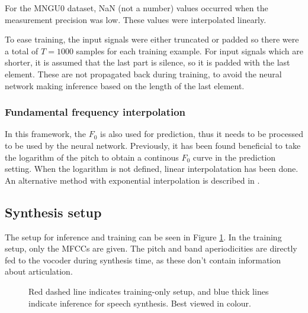 \documentclass[a4paper]{article}
\begin{document}
For the MNGU0 dataset, NaN (not a number) values occurred when the measurement precision
was low. These values were interpolated linearly. 

To ease training, the input signals were either truncated or padded
so there were a total of \( T = 1000 \) samples for each training example.
For input signals which are shorter, it is assumed that the last part is
silence, so it is padded with the last element. These are not propagated back during training, to avoid the neural network making inference based on the length of the last element.

\subsubsection{Fundamental frequency interpolation}

In this framework, the \( F_0 \) is also used for prediction, thus it
needs to be processed to be used by the neural network. 
Previously, it has been found beneficial to take the logarithm of the
pitch to obtain a continous \( F_0 \) curve in the prediction setting.
When the logarithm is not defined, linear  interpolatation has been done. \cite{Gonzalez2017}
An alternative method with exponential interpolation is described in \cite{Chen1997}.

\subsection{Synthesis setup}

The setup for inference and training can be seen in Figure \ref{fig:structure}.
In the training setup, only the MFCCs are given.
The pitch and band aperiodicities are directly fed to the vocoder
during synthesis time, as these don't contain information about articulation. 

\begin{figure}
  \caption{Red dashed line indicates training-only setup, and blue thick lines indicate inference for speech synthesis. Best viewed in colour.}
  \label{fig:structure}
\end{figure}
\end{document}
